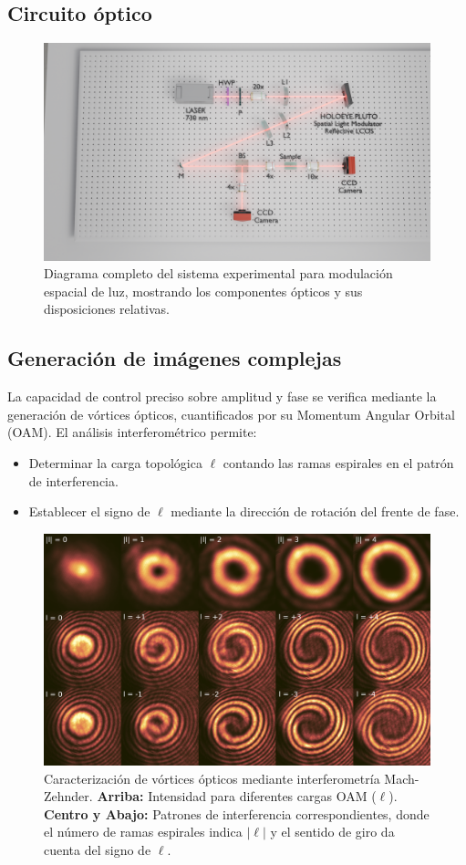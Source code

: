 \subsection{Circuito óptico}
\begin{figure}[H]
	\centering
	\includegraphics[width=0.8\linewidth, trim={21cm 5cm 7cm 5cm}, clip]{media/SLM_setupv1}
	\caption[Diagrama del sistema de modulación espacial de luz]{Diagrama completo del sistema experimental para modulación espacial de luz, mostrando los componentes ópticos y sus disposiciones relativas.}
	\label{fig:SLM_setup}
\end{figure}

\subsection{Generación de imágenes complejas \label{cap:oam}}
La capacidad de control preciso sobre amplitud y fase se verifica mediante la generación de vórtices ópticos, cuantificados por su Momentum Angular Orbital (OAM). El análisis interferométrico permite:
\begin{itemize}
	\item Determinar la carga topológica $\ell$ contando las ramas espirales en el patrón de interferencia.
	\item Establecer el signo de $\ell$ mediante la dirección de rotación del frente de fase.
\end{itemize}

\begin{figure}[H]
	\centering
	\includegraphics[width=0.8\linewidth]{media/OAM-free.png}
	\caption[Caracterización de vórtices ópticos mediante interferometría Mach-Zehnder.]{Caracterización de vórtices ópticos mediante interferometría Mach-Zehnder. \textbf{Arriba:} Intensidad para diferentes cargas OAM ($\ell$). \textbf{Centro y Abajo:} Patrones de interferencia correspondientes, donde el número de ramas espirales indica $|\ell|$ y el sentido de giro da cuenta del signo de $\ell$.}
	\label{fig:OAM}
\end{figure}
